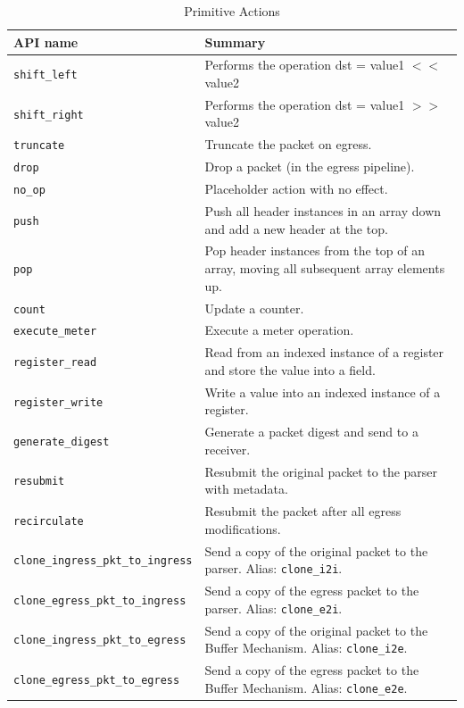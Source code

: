 \documentclass[12pt]{article}
\begin{document}
\begin{table}[H]
\begin{center}
\begin{tabular}{| l | p{} |} \hline
\textbf{API name} &
\textbf{Summary} \\ \hline
\texttt{\color{red}shift_left} &
Performs the operation dst = value1 $<<$ value2 \\ \hline
\texttt{\color{red}shift_right} &
Performs the operation dst = value1 $>>$ value2 \\ \hline
\texttt{truncate} &
Truncate the packet on egress. \\ \hline
\texttt{drop} &
Drop a packet (in the egress pipeline). \\ \hline
\texttt{no_op} &
Placeholder action with no effect. \\ \hline
\texttt{push} &
Push all header instances in an array down and add a new header at the top. \\ \hline
\texttt{pop} &
Pop header instances from the top of an array, moving all subsequent array elements up. \\ \hline
\texttt{count} &
Update a counter. \\ \hline
\texttt{\color{red}execute_meter} &
Execute a meter operation. \\ \hline
\texttt{\color{red}register_read} &
{\color{red}Read from an indexed instance of a register and store the value into a field.} \\ \hline
\texttt{\color{red}register_write} &
{\color{red}Write a value into an indexed instance of a register. }\\ \hline
\texttt{generate_digest} &
Generate a packet digest and send to a receiver. \\ \hline
\texttt{resubmit} &
Resubmit the original packet to the parser with metadata. \\ \hline
\texttt{recirculate} &
Resubmit the packet after all egress modifications. \\ \hline
\texttt{clone_ingress_pkt_to_ingress} &
Send a copy of the original packet to the parser. Alias: \texttt{clone_i2i}. \\ \hline
\texttt{clone_egress_pkt_to_ingress} &
Send a copy of the egress packet to the parser. Alias: \texttt{clone_e2i}. \\ \hline
\texttt{clone_ingress_pkt_to_egress} &
Send a copy of the original packet to the Buffer Mechanism. Alias: \texttt{clone_i2e}. \\ \hline
\texttt{clone_egress_pkt_to_egress} &
Send a copy of the egress packet to the Buffer Mechanism. Alias: \texttt{clone_e2e}. \\ \hline
\end{tabular}
\end{center}
\caption{Primitive Actions}
\label{tab:primitiveactions}
\end{table}
\end{document}
